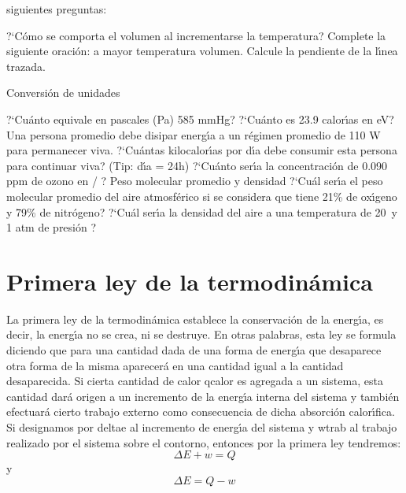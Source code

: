\begin{exercises}
siguientes preguntas:

\subexer ?`C\'omo se comporta  el volumen al incrementarse la
temperatura?
\subexer Complete la siguiente oraci\'on: a mayor temperatura \hrulefill
\hskip 1mm volumen.
\subexer Calcule la pendiente de la l\'{\i}nea trazada.


\exer Conversi\'on de unidades

\subexer  ?`Cu\'anto equivale en pascales (Pa) 585 mmHg?
\subexer ?`Cu\'anto es 23.9 calor\'{\i}as en eV?
\subexer Una persona promedio debe disipar energ\'{\i}a a un
r\'egimen promedio de 110 W para permanecer viva.  ?`Cu\'antas kilocalor\'{\i}as por d\'{\i}a debe consumir
esta persona para continuar viva? (Tip: d\'{\i}a = 24h) 
\subexer  ?`Cu\'anto ser\'{\i}a la concentraci\'on de 0.090 ppm de ozono en \milli\gram / \cubic\metre ?
\exer Peso molecular promedio y densidad
\subexer ?`Cu\'al ser\'{\i}a el peso molecular promedio del aire atmosf\'erico si se considera que tiene 21\% de ox\'{\i}geno y 79\% de nitr\'ogeno? 
\subexer ?`Cu\'al ser\'{\i}a la densidad del aire a una temperatura de 20\celsius\, y 1 atm de presi\'on ? 
\end{exercises}

\section{Primera ley de la termodin\'amica}
La primera ley de la termodin\'amica establece la conservaci\'on de la
energ\'{\i}a, es decir, la energ\'{\i}a no se crea, ni se destruye. En otras
palabras, esta ley se formula diciendo que para una cantidad dada de
una forma de e\-nerg\'{\i}a que desaparece otra forma de la misma
aparecer\'a en una cantidad igual a la cantidad desaparecida.
Si cierta cantidad de calor \gls{qcalor} es agregada a un sistema, esta cantidad dar\'a origen a un incremento de la energ\'{\i}a interna del sistema
y tambi\'en efectuar\'a cierto trabajo externo como consecuencia de dicha absorci\'on calor\'{\i}fica. Si designamos por \gls{deltae} al incremento de
energ\'{\i}a del sistema y \gls{wtrab} al trabajo realizado por el sistema sobre el contorno, entonces por la primera ley tendremos:
\begin{equation}
\Delta E + w = Q
\end{equation}
y
\begin{equation}
\Delta E = Q - w
\end{equation}
